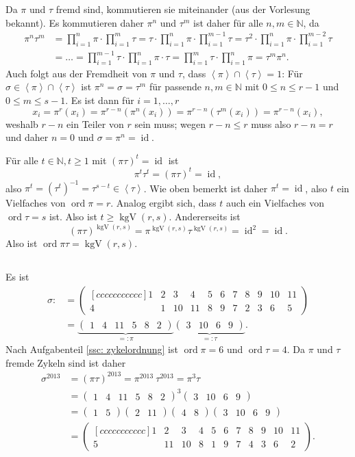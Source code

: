 \documentclass[a4paper,10pt]{article}
\theoremstyle{definition}
\newcommand{\N}{\mathbb{N}}
\newcommand{\id}{\operatorname{id}}
\newcommand{\ord}{\operatorname{ord}}
\newcommand{\kgV}{\operatorname{kgV}}
\newcommand{\vect}[1]{\begin{pmatrix}#1\end{pmatrix}}
\newcommand{\gen}[1]{\left\langle#1\right\rangle}
\begin{document}
Da $\pi$ und $\tau$ fremd sind, kommutieren sie miteinander (aus der Vorlesung bekannt). Es kommutieren daher $\pi^n$ und $\tau^m$ ist daher für alle $n,m \in \N$, da
\begin{align*}
 \pi^n \tau^m
 &= \prod_{i=1}^n \pi \cdot \prod_{i=1}^m \tau
 = \tau \cdot \prod_{i=1}^n \pi \cdot \prod_{i=1}^{m-1} \tau
 = \tau^2 \cdot \prod_{i=1}^n \pi \cdot \prod_{i=1}^{m-2} \tau \\
 &= \ldots
 = \prod_{i=1}^{m-1} \tau \cdot \prod_{i=1}^n \pi \cdot \tau
 = \prod_{i=1}^m \tau \cdot \prod_{i=1}^n \pi
 = \tau^m \pi^n.
\end{align*}
Auch folgt aus der Fremdheit von $\pi$ und $\tau$, dass $\gen{\pi} \cap \gen{\tau} = 1$: Für $\sigma \in \gen{\pi} \cap \gen{\tau}$ ist $\pi^n = \sigma = \tau^m$ für passende $n,m \in \N$ mit $0 \leq n \leq r-1$ und $0 \leq m \leq s-1$. Es ist dann für $i=1,\ldots,r$
\[
 x_i = \pi^{r}(x_i) = \pi^{r-n}(\pi^n(x_i)) = \pi^{r-n}(\tau^m(x_i)) = \pi^{r-n}(x_i),
\]
weshalb $r-n$ ein Teiler von $r$ sein muss; wegen $r-n \leq r$ muss also $r-n = r$ und daher $n=0$ und $\sigma = \pi^n = \id$.

Für alle $t \in \N, t \geq 1$ mit $(\pi \tau)^t = \id$ ist
\[
 \pi^t \tau^t = (\pi \tau)^t = \id,
\]
also $\pi^t = (\tau^t)^{-1} = \tau^{s-t} \in \gen{\tau}$. Wie oben bemerkt ist daher $\pi^t = \id$, also $t$ ein Vielfaches von $\ord \pi = r$. Analog ergibt sich, dass $t$ auch ein Vielfaches von $\ord \tau = s$ ist. Also ist $t \geq \kgV(r,s)$. Andererseits ist
\[
 (\pi \tau)^{\kgV(r,s)} = \pi^{\kgV(r,s)} \tau^{\kgV(r,s)} = \id^2 = \id.
\]
Also ist $\ord \pi\tau = \kgV(r,s)$.


\subsection{}
Es ist
\begin{align*}
 \sigma :&=
 \begin{pmatrix}[ccccccccccc]
  1 & 2 &  3 &  4 & 5 & 6 & 7 & 8 & 9 & 10 & 11\\
  4 & 1 & 10 & 11 & 8 & 9 & 7 & 2 & 3 &  6 & 5
 \end{pmatrix} \\
 &= \underbrace{\vect{1 & 4 & 11 & 5 & 8 & 2}}_{=: \pi} \underbrace{\vect{3 & 10 & 6 & 9}}_{=: \tau}.
\end{align*}
Nach Aufgabenteil \ref{ssc: zykelordnung} ist $\ord \pi = 6$ und $\ord \tau = 4$.
Da $\pi$ und $\tau$ fremde Zykeln sind ist daher
\begin{align*}
 \sigma^{2013}
 &= (\pi \tau)^{2013}
 = \pi^{2013}\ \tau^{2013}
 = \pi^3 \tau \\
 &= \vect{1 & 4 & 11 & 5 & 8 & 2}^3 \vect{3 & 10 & 6 & 9} \\
 &= \vect{1 & 5} \vect{2 & 11} \vect{4 & 8} \vect{3 & 10 & 6 & 9} \\
 &=
 \begin{pmatrix}[ccccccccccc]
  1 &  2 &  3 & 4 & 5 & 6 & 7 & 8 & 9 & 10 & 11\\
  5 & 11 & 10 & 8 & 1 & 9 & 7 & 4 & 3 &  6 &  2
 \end{pmatrix}.
\end{align*}
\end{document}
